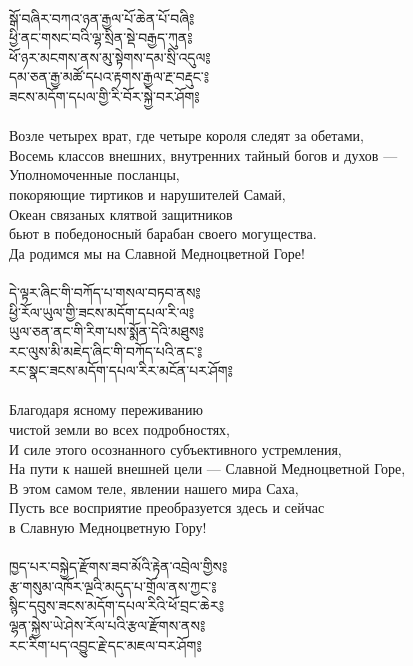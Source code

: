\\
{\ti སྒོ་བཞིར་བཀའ་ཉན་རྒྱལ་པོ་ཆེན་པོ་བཞི༔\\
ཕྱི་ནང་གསང་བའི་ལྷ་སྲིན་སྡེ་བརྒྱད་ཀུན༔\\
ཕོ་ཉར་མངགས་ནས་མུ་སྟེགས་དམ་སྲི་འདུལ༔\\
དམ་ཅན་རྒྱ་མཚོ་དཔའ་རྟགས་རྒྱལ་རྔ་བརྡུང་༔\\
ཟངས་མདོག་དཔལ་གྱི་རི་བོར་སྐྱེ་བར་ཤོག༔}\\
\\
\ru
Возле четырех врат, где четыре короля следят за обетами,\\
Восемь классов внешних, внутренних тайный богов и духов —\\
Уполномоченные посланцы, \\ \indent покоряющие тиртиков и нарушителей Самай,\\
Океан связаных клятвой защитников \\ \indent бьют в победоносный барабан своего могущества.\\
Да родимся мы на Славной Медноцветной Горе!\\
\\
\newpage
{\ti དེ་ལྟར་ཞིང་གི་བཀོད་པ་གསལ་བཏབ་ནས༔\\
ཕྱི་རོལ་ཡུལ་གྱི་ཟངས་མདོག་དཔལ་རི་ལ༔\\
ཡུལ་ཅན་ནང་གི་རིག་པས་སྨོན་དེའི་མཐུས༔\\
རང་ལུས་མི་མཇེད་ཞིང་གི་བཀོད་པའི་ནང་༔\\
རང་སྣང་ཟངས་མདོག་དཔལ་རིར་མངོན་པར་ཤོག༔}\\
\\
\ru
Благодаря ясному переживанию \\ \indent чистой земли во всех подробностях,\\
И силе этого осознанного субъективного устремления,\\
На пути к нашей внешней цели — Славной Медноцветной Горе,\\
В этом самом теле, явлении нашего мира Саха,\\
Пусть все восприятие преобразуется здесь и сейчас \\ \indent в Славную Медноцветную Гору!\\
\\
{\ti ཁྱད་པར་བསྐྱེད་རྫོགས་ཟབ་མོའི་རྟེན་འབྲེལ་གྱིས༔\\
རྩ་གསུམ་འཁོར་ལྔའི་མདུད་པ་གྲོལ་ནས་ཀྱང་༔\\
སྙིང་དབུས་ཟངས་མདོག་དཔལ་རིའི་ཕོ་བྲང་ཆེར༔\\
ལྷན་སྐྱེས་ཡེ་ཤེས་རོལ་པའི་རྩལ་རྫོགས་ནས༔\\
རང་རིག་པད་འབྱུང་རྗེ་དང་མཇལ་བར་ཤོག༔}\\

